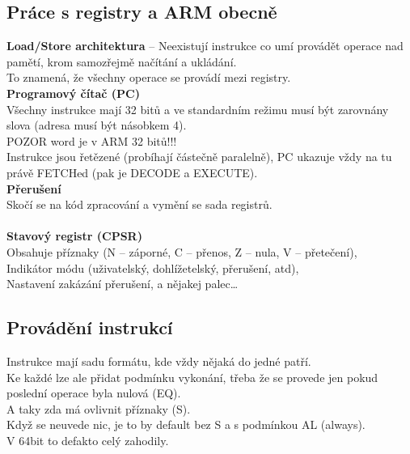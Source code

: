 \documentclass[
]{cz_sablona}
\begin{document}
\subsection{Práce s registry a ARM obecně}
\textbf{Load/Store architektura} 
-- Neexistují instrukce co umí provádět operace nad pamětí,
krom samozřejmě načítání a ukládání.
\\[0.5em]
To znamená, že všechny operace se provádí mezi registry.
\\[0.5em]
\textbf{Programový čítač (PC)}\\
Všechny instrukce mají 32 bitů a ve standardním
režimu musí být zarovnány slova (adresa musí být násobkem 4).\\
POZOR word je v ARM 32 bitů!!!\\
Instrukce jsou řetězené (probíhají částečně paralelně),
PC ukazuje vždy na tu právě FETCHed (pak je DECODE a EXECUTE).\\
\textbf{Přerušení}\\
Skočí se na kód zpracování a vymění se sada registrů.\\
\\[0.5em]
\textbf{Stavový registr (CPSR)}\\
Obsahuje příznaky (N -- záporné, C -- přenos, Z -- nula, V -- přetečení),\\
Indikátor módu (uživatelský, dohlížetelský, přerušení, atd),\\
Nastavení zakázání přerušení, a nějakej palec\dots

\subsection{Provádění instrukcí}
Instrukce mají sadu formátu, kde vždy nějaká do jedné patří.\\
Ke každé lze ale přidat podmínku vykonání, třeba že se provede jen pokud poslední operace byla nulová (EQ).\\
A taky zda má ovlivnit příznaky (S).\\
Když se neuvede nic, je to by default bez S a s podmínkou AL (always).\\
V 64bit to defakto celý zahodily.\\
\end{document}
